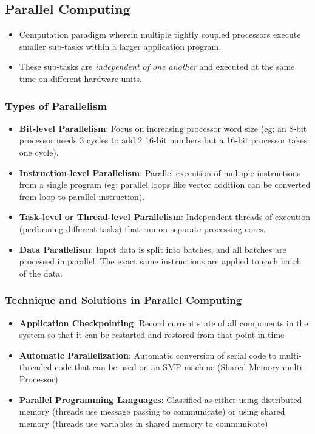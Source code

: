 \documentclass{article}
\begin{document}
\subsection{Parallel Computing}
\begin{itemize}
    \item Computation paradigm wherein multiple tightly coupled processors execute smaller sub-tasks within a larger application program.
    
    \item These sub-tasks are \textit{independent of one another} and executed at the same time on different hardware units. 
\end{itemize}

\subsubsection{Types of Parallelism}
\begin{itemize}
    \item \textbf{Bit-level Parallelism}: Focus on increasing processor word size (eg: an 8-bit processor needs 3 cycles to add 2 16-bit numbers but a 16-bit processor takes one cycle). 
    
    \item \textbf{Instruction-level Parallelism}: Parallel execution of multiple instructions from a single program (eg: parallel loops like vector addition can be converted from loop to parallel instruction).
    
    \item \textbf{Task-level or Thread-level Parallelism}: Independent threads of execution (performing different tasks) that run on separate processing cores. 
    
    \item \textbf{Data Parallelism}: Input data is split into batches, and all batches are processed in parallel. The exact same instructions are applied to each batch of the data. 
\end{itemize}

\subsubsection{Technique and Solutions in Parallel Computing}
\begin{itemize}
    \item \textbf{Application Checkpointing}: Record current state of all components in the system so that it can be restarted and restored from that point in time 
    
    \item \textbf{Automatic Parallelization}: Automatic conversion of serial code to multi-threaded code that can be used on an SMP machine (Shared Memory multi-Processor)
    
    \item \textbf{Parallel Programming Languages}: Classified as either using distributed memory (threads use message passing to communicate) or using shared memory (threads use variables in shared memory to communicate)
\end{itemize}
\end{document}
